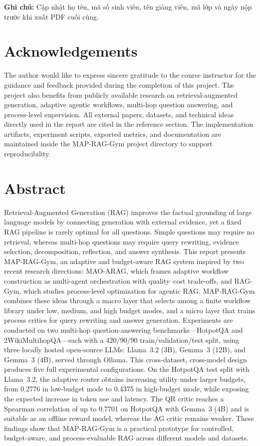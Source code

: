 \documentclass[12pt,a4paper]{article}
\newcommand{\vnote}[1]{{\selectlanguage{vietnamese}\noindent\textcolor{notered}{\textbf{Ghi chú:} #1}\selectlanguage{english}}}
\begin{document}
\vnote{Cập nhật họ tên, mã số sinh viên, tên giảng viên, mã lớp và ngày nộp trước khi xuất PDF cuối cùng.}

\newpage

\section*{Acknowledgements}

The author would like to express sincere gratitude to the course instructor for the guidance and feedback provided during the completion of this project. The project also benefits from publicly available research on retrieval-augmented generation, adaptive agentic workflows, multi-hop question answering, and process-level supervision. All external papers, datasets, and technical ideas directly used in the report are cited in the reference section. The implementation artifacts, experiment scripts, exported metrics, and documentation are maintained inside the MAP-RAG-Gym project directory to support reproducibility.

\newpage
\tableofcontents
\newpage

\section*{Abstract}

Retrieval-Augmented Generation (RAG) improves the factual grounding of large language models by connecting generation with external evidence, yet a fixed RAG pipeline is rarely optimal for all questions. Simple questions may require no retrieval, whereas multi-hop questions may require query rewriting, evidence selection, decomposition, reflection, and answer synthesis. This report presents MAP-RAG-Gym, an adaptive and budget-aware RAG system inspired by two recent research directions: MAO-ARAG, which frames adaptive workflow construction as multi-agent orchestration with quality--cost trade-offs, and RAG-Gym, which studies process-level optimization for agentic RAG. MAP-RAG-Gym combines these ideas through a macro layer that selects among a finite workflow library under low, medium, and high budget modes, and a micro layer that trains process critics for query rewriting and answer generation. Experiments are conducted on two multi-hop question-answering benchmarks---HotpotQA and 2WikiMultihopQA---each with a 420/90/90 train/validation/test split, using three locally hosted open-source LLMs: Llama~3.2 (3B), Gemma~3 (12B), and Gemma~3 (4B), served through Ollama. This cross-dataset, cross-model design produces five full experimental configurations. On the HotpotQA test split with Llama~3.2, the adaptive router obtains increasing utility under larger budgets, from 0.2776 in low-budget mode to 0.4375 in high-budget mode, while exposing the expected increase in token use and latency. The QR critic reaches a Spearman correlation of up to 0.7701 on HotpotQA with Gemma~3 (4B) and is suitable as an offline reward model, whereas the AG critic remains weaker. These findings show that MAP-RAG-Gym is a practical prototype for controlled, budget-aware, and process-evaluable RAG across different models and datasets.
\end{document}

